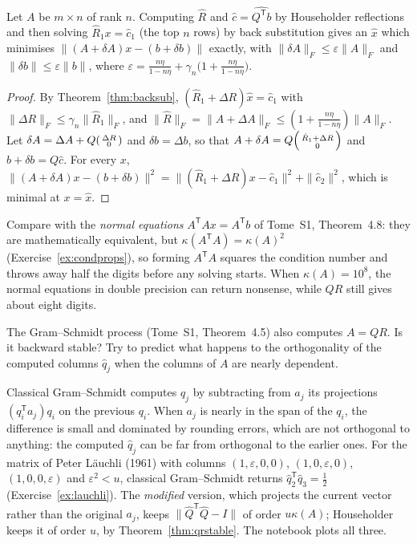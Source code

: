 \begin{corollary}\label{cor:lsq}
Let $A$ be $m\times n$ of rank $n$. Computing $\hat R$ and $\hat c=\widehat{Q^{\mathsf T}b}$ by Householder reflections and then solving $\hat R_1x=\hat c_1$ (the
top $n$ rows) by back substitution gives an $\hat x$ which minimises $\|(A+\delta A)x-(b+\delta b)\|$ exactly, with
$\|\delta A\|_F\le\varepsilon\|A\|_F$ and $\|\delta b\|\le\varepsilon\|b\|$, where $\varepsilon=\frac{n\eta}{1-n\eta}+\gamma_n\bigl(1+\frac{n\eta}{1-n\eta}\bigr)$.
\end{corollary}
\begin{proof}
By Theorem~\ref{thm:backsub}, $(\hat R_1+\Delta R)\hat x=\hat c_1$ with $\|\Delta R\|_F\le\gamma_n\|\hat R_1\|_F$, and
$\|\hat R\|_F=\|A+\Delta A\|_F\le(1+\frac{n\eta}{1-n\eta})\|A\|_F$. Let $\delta A=\Delta A+Q\begin{psmallmatrix}\Delta R\\0\end{psmallmatrix}$ and $\delta b=\Delta b$,
so that $A+\delta A=Q\begin{psmallmatrix}\hat R_1+\Delta R\\0\end{psmallmatrix}$ and $b+\delta b=Q\hat c$. For every $x$,
$\|(A+\delta A)x-(b+\delta b)\|^2=\|(\hat R_1+\Delta R)x-\hat c_1\|^2+\|\hat c_2\|^2$, which is minimal at $x=\hat x$.
\end{proof}

Compare with the \emph{normal equations} $A^{\mathsf T}Ax=A^{\mathsf T}b$ of Tome~S1, Theorem~4.8: they are mathematically equivalent, but
$\kappa(A^{\mathsf T}A)=\kappa(A)^2$ (Exercise~\ref{ex:condprops}), so forming $A^{\mathsf T}A$ squares the condition number and throws away half the digits
before any solving starts. When $\kappa(A)=10^8$, the normal equations in double precision can return nonsense, while $QR$ still gives about eight digits.

\begin{think}
The Gram--Schmidt process (Tome~S1, Theorem~4.5) also computes $A=QR$. Is it backward stable? Try to predict what happens to the orthogonality of the
computed columns $\hat q_j$ when the columns of $A$ are nearly dependent.
\end{think}

Classical Gram--Schmidt computes $q_j$ by subtracting from $a_j$ its projections $(q_i^{\mathsf T}a_j)q_i$ on the previous $q_i$. When $a_j$ is nearly in
the span of the $q_i$, the difference is small and dominated by rounding errors, which are not orthogonal to anything: the computed $\hat q_j$ can be far
from orthogonal to the earlier ones. For the matrix of Peter L\"auchli (1961) with columns $(1,\varepsilon,0,0)$, $(1,0,\varepsilon,0)$, $(1,0,0,\varepsilon)$ and
$\varepsilon^2<u$, classical Gram--Schmidt returns $\hat q_2^{\mathsf T}\hat q_3=\frac12$ (Exercise~\ref{ex:lauchli}). The \emph{modified} version, which projects
the current vector rather than the original $a_j$, keeps $\|\hat Q^{\mathsf T}\hat Q-I\|$ of order $u\kappa(A)$; Householder keeps it of order $u$, by
Theorem~\ref{thm:qrstable}. The notebook plots all three.

